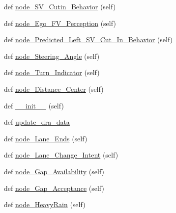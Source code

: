 \begin{DoxyCompactItemize}
\item 
def \hyperlink{classbayesian__network__config_1_1_bayesian_network_config_a6510c23dac8fb0c36ee38283e5815d54}{node\+\_\+\+S\+V\+\_\+\+Cutin\+\_\+\+Behavior} (self)
\item 
def \hyperlink{classbayesian__network__config_1_1_bayesian_network_config_aff3733f4b57dcb4c4cbc0184ea07c133}{node\+\_\+\+Ego\+\_\+\+F\+V\+\_\+\+Perception} (self)
\item 
def \hyperlink{classbayesian__network__config_1_1_bayesian_network_config_abb5410a7bd4f2c2fe9cb04057d9c5e34}{node\+\_\+\+Predicted\+\_\+\+Left\+\_\+\+S\+V\+\_\+\+Cut\+\_\+\+In\+\_\+\+Behavior} (self)
\item 
def \hyperlink{classbayesian__network__config_1_1_bayesian_network_config_a27d247927ce168025568fdf0d467b78d}{node\+\_\+\+Steering\+\_\+\+Angle} (self)
\item 
def \hyperlink{classbayesian__network__config_1_1_bayesian_network_config_ac9fee7655297b9617622e9c4d4669a23}{node\+\_\+\+Turn\+\_\+\+Indicator} (self)
\item 
def \hyperlink{classbayesian__network__config_1_1_bayesian_network_config_a3cf26cc8ccfdff070ff06302ce79f4f5}{node\+\_\+\+Distance\+\_\+\+Center} (self)
\item 
def \hyperlink{classbayesian__network__config_1_1_bayesian_network_config_aeee7107b8b3f2b2cd42c3d57fb4235c3}{\+\_\+\+\_\+init\+\_\+\+\_\+} (self)
\item 
def \hyperlink{classbayesian__network__config_1_1_bayesian_network_config_a5324414961900ca2eede9cc160a24ff7}{update\+\_\+dra\+\_\+data}
\item 
def \hyperlink{classbayesian__network__config_1_1_bayesian_network_config_a9a6e2aefc96155fcdd4a825b1defbe76}{node\+\_\+\+Lane\+\_\+\+Ends} (self)
\item 
def \hyperlink{classbayesian__network__config_1_1_bayesian_network_config_a597ae7d023043c246dc2e31ceb125eec}{node\+\_\+\+Lane\+\_\+\+Change\+\_\+\+Intent} (self)
\item 
def \hyperlink{classbayesian__network__config_1_1_bayesian_network_config_a86c973a53f1f78567b32ffa68cea467a}{node\+\_\+\+Gap\+\_\+\+Availability} (self)
\item 
def \hyperlink{classbayesian__network__config_1_1_bayesian_network_config_a86c960e95351259be8f751f98ac91aa5}{node\+\_\+\+Gap\+\_\+\+Acceptance} (self)
\item 
def \hyperlink{classbayesian__network__config_1_1_bayesian_network_config_a7e92e0763a594ce2d1ac0e6cf4ed6658}{node\+\_\+\+Heavy\+Rain} (self)

\end{DoxyCompactItemize}
